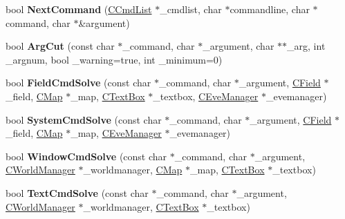 \begin{DoxyCompactItemize}
\item 
bool {\bfseries Next\+Command} (\hyperlink{class_c_cmd_list}{C\+Cmd\+List} $\ast$\+\_\+cmdlist, char $\ast$commandline, char $\ast$command, char $\ast$\&argument)\hypertarget{class_c_cmd_manager_a74d315e43349a013acd72fb0af98fb02}{}\label{class_c_cmd_manager_a74d315e43349a013acd72fb0af98fb02}

\item 
bool {\bfseries Arg\+Cut} (const char $\ast$\+\_\+command, char $\ast$\+\_\+argument, char $\ast$$\ast$\+\_\+arg, int \+\_\+argnum, bool \+\_\+warning=true, int \+\_\+minimum=0)\hypertarget{class_c_cmd_manager_ad0dc5d075df407798ff1646d523a078a}{}\label{class_c_cmd_manager_ad0dc5d075df407798ff1646d523a078a}

\item 
bool {\bfseries Field\+Cmd\+Solve} (const char $\ast$\+\_\+command, char $\ast$\+\_\+argument, \hyperlink{class_c_field}{C\+Field} $\ast$\+\_\+field, \hyperlink{class_c_map}{C\+Map} $\ast$\+\_\+map, \hyperlink{class_c_text_box}{C\+Text\+Box} $\ast$\+\_\+textbox, \hyperlink{class_c_eve_manager}{C\+Eve\+Manager} $\ast$\+\_\+evemanager)\hypertarget{class_c_cmd_manager_a5073fb7631fb3c8c51237726eb205593}{}\label{class_c_cmd_manager_a5073fb7631fb3c8c51237726eb205593}

\item 
bool {\bfseries System\+Cmd\+Solve} (const char $\ast$\+\_\+command, char $\ast$\+\_\+argument, \hyperlink{class_c_field}{C\+Field} $\ast$\+\_\+field, \hyperlink{class_c_map}{C\+Map} $\ast$\+\_\+map, \hyperlink{class_c_eve_manager}{C\+Eve\+Manager} $\ast$\+\_\+evemanager)\hypertarget{class_c_cmd_manager_a99d06c941837daf808274a5acfc807bd}{}\label{class_c_cmd_manager_a99d06c941837daf808274a5acfc807bd}

\item 
bool {\bfseries Window\+Cmd\+Solve} (const char $\ast$\+\_\+command, char $\ast$\+\_\+argument, \hyperlink{class_c_world_manager}{C\+World\+Manager} $\ast$\+\_\+worldmanager, \hyperlink{class_c_map}{C\+Map} $\ast$\+\_\+map, \hyperlink{class_c_text_box}{C\+Text\+Box} $\ast$\+\_\+textbox)\hypertarget{class_c_cmd_manager_a7adddb1eba418750408c24d2d6f70018}{}\label{class_c_cmd_manager_a7adddb1eba418750408c24d2d6f70018}

\item 
bool {\bfseries Text\+Cmd\+Solve} (const char $\ast$\+\_\+command, char $\ast$\+\_\+argument, \hyperlink{class_c_world_manager}{C\+World\+Manager} $\ast$\+\_\+worldmanager, \hyperlink{class_c_text_box}{C\+Text\+Box} $\ast$\+\_\+textbox)\hypertarget{class_c_cmd_manager_ae2c76d32ac406e7fd3e1858bd2cf9d21}{}\label{class_c_cmd_manager_ae2c76d32ac406e7fd3e1858bd2cf9d21}


\end{DoxyCompactItemize}
